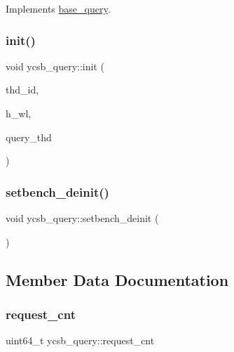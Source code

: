 Implements \hyperlink{classbase__query_a341a99285c6e849eae1c5a83485335f3}{base\+\_\+query}.

\mbox{\label{classycsb__query_a3af1d2ce40522812859d6a364a7a0c1b}} 
\subsubsection{\texorpdfstring{init()}{init()}\hspace{0.1cm}{\footnotesize\ttfamily [2/2]}}
{\footnotesize\ttfamily void ycsb\+\_\+query\+::init (\begin{DoxyParamCaption}\item[{uint64\+\_\+t}]{thd\+\_\+id,  }\item[{\hyperlink{classworkload}{workload} $\ast$}]{h\+\_\+wl,  }\item[{\hyperlink{classQuery__thd}{Query\+\_\+thd} $\ast$}]{query\+\_\+thd }\end{DoxyParamCaption})}

\mbox{\label{classycsb__query_a37873fbb1e7daa27b3955ee20e02a489}} 
\subsubsection{\texorpdfstring{setbench\+\_\+deinit()}{setbench\_deinit()}}
{\footnotesize\ttfamily void ycsb\+\_\+query\+::setbench\+\_\+deinit (\begin{DoxyParamCaption}{ }\end{DoxyParamCaption})}



\subsection{Member Data Documentation}
\mbox{\label{classycsb__query_a3626ff0e3508d4b5fe7dc2b9b485cdca}} 
\subsubsection{\texorpdfstring{request\+\_\+cnt}{request\_cnt}}
{\footnotesize\ttfamily uint64\+\_\+t ycsb\+\_\+query\+::request\+\_\+cnt}

